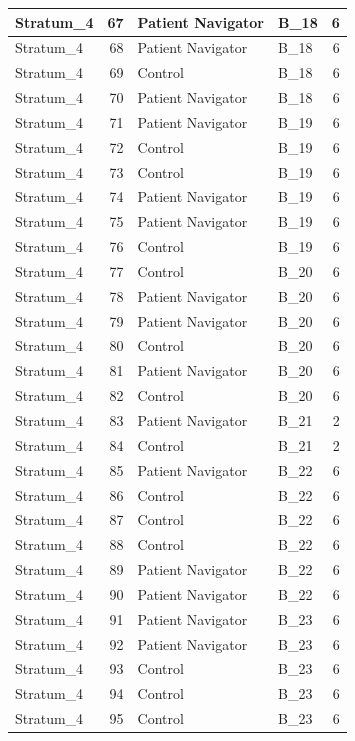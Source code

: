 \documentclass[
]{book}
\begin{document}
\begin{table}[H]
\begin{tabular}{l|r|l|l|r}
\hline
Stratum\_4 & 67 & Patient Navigator & B\_18 & 6\\
\hline
Stratum\_4 & 68 & Patient Navigator & B\_18 & 6\\
\hline
Stratum\_4 & 69 & Control & B\_18 & 6\\
\hline
Stratum\_4 & 70 & Patient Navigator & B\_18 & 6\\
\hline
Stratum\_4 & 71 & Patient Navigator & B\_19 & 6\\
\hline
Stratum\_4 & 72 & Control & B\_19 & 6\\
\hline
Stratum\_4 & 73 & Control & B\_19 & 6\\
\hline
Stratum\_4 & 74 & Patient Navigator & B\_19 & 6\\
\hline
Stratum\_4 & 75 & Patient Navigator & B\_19 & 6\\
\hline
Stratum\_4 & 76 & Control & B\_19 & 6\\
\hline
Stratum\_4 & 77 & Control & B\_20 & 6\\
\hline
Stratum\_4 & 78 & Patient Navigator & B\_20 & 6\\
\hline
Stratum\_4 & 79 & Patient Navigator & B\_20 & 6\\
\hline
Stratum\_4 & 80 & Control & B\_20 & 6\\
\hline
Stratum\_4 & 81 & Patient Navigator & B\_20 & 6\\
\hline
Stratum\_4 & 82 & Control & B\_20 & 6\\
\hline
Stratum\_4 & 83 & Patient Navigator & B\_21 & 2\\
\hline
Stratum\_4 & 84 & Control & B\_21 & 2\\
\hline
Stratum\_4 & 85 & Patient Navigator & B\_22 & 6\\
\hline
Stratum\_4 & 86 & Control & B\_22 & 6\\
\hline
Stratum\_4 & 87 & Control & B\_22 & 6\\
\hline
Stratum\_4 & 88 & Control & B\_22 & 6\\
\hline
Stratum\_4 & 89 & Patient Navigator & B\_22 & 6\\
\hline
Stratum\_4 & 90 & Patient Navigator & B\_22 & 6\\
\hline
Stratum\_4 & 91 & Patient Navigator & B\_23 & 6\\
\hline
Stratum\_4 & 92 & Patient Navigator & B\_23 & 6\\
\hline
Stratum\_4 & 93 & Control & B\_23 & 6\\
\hline
Stratum\_4 & 94 & Control & B\_23 & 6\\
\hline
Stratum\_4 & 95 & Control & B\_23 & 6\\

\end{tabular}
\end{table}
\end{document}
